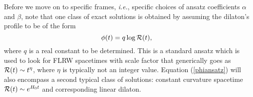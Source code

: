 \documentclass[amsmath,amssymb,11pt]{article}
\begin{document}







Before we move on to specific frames, \emph{i.e.}, specific choices of ansatz coefficients $\alpha$ and $\beta$, note that one class of exact solutions is obtained by assuming the dilaton's profile to be of the form
\begin{equation}\label{phiansatz}
\phi(t) = q\log\mathcal{R}(t),
\end{equation}
where $q$ is a real constant to be determined. This is a standard ansatz which is used to look for FLRW spacetimes with scale factor that generically goes as $\mathcal{R}(t)\sim t^{\eta}$, where $\eta$ is typically not an integer value. Equation (\ref{phiansatz}) will also encompass a second typical class of solutions: constant curvature spacetime $\mathcal{R}(t)\sim e^{H_0 t}$ and corresponding linear dilaton.
\end{document}

